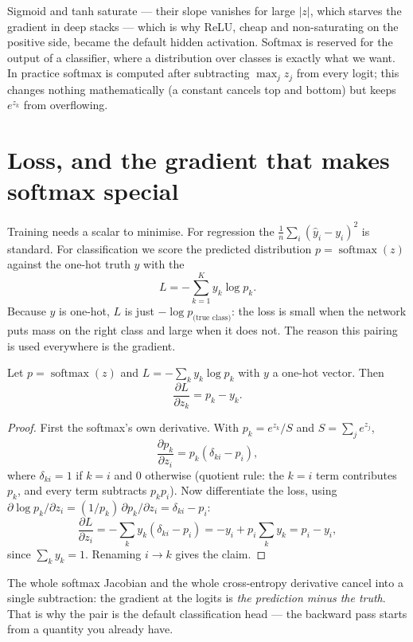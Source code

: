 \documentclass[11pt]{article}
\begin{document}
Sigmoid and tanh saturate --- their slope vanishes for large $|z|$, which
starves the gradient in deep stacks --- which is why ReLU, cheap and
non-saturating on the positive side, became the default hidden activation.
Softmax is reserved for the output of a classifier, where a distribution over
classes is exactly what we want. In practice softmax is computed after
subtracting $\max_j z_j$ from every logit; this changes nothing mathematically
(a constant cancels top and bottom) but keeps $e^{z_k}$ from overflowing.

\section{Loss, and the gradient that makes softmax special}

Training needs a scalar to minimise. For regression the  $\tfrac1n\sum_i (\hat y_i - y_i)^2$ is standard. For classification we
score the predicted distribution $p=\operatorname{softmax}(z)$ against the
one-hot truth $y$ with the 
\[
  L = -\sum_{k=1}^{K} y_k \log p_k .
\]
Because $y$ is one-hot, $L$ is just $-\log p_{\text{(true class)}}$: the loss is
small when the network puts mass on the right class and large when it does not.
The reason this pairing is used everywhere is the gradient.

\begin{theorem}
Let $p=\operatorname{softmax}(z)$ and $L = -\sum_k y_k \log p_k$ with $y$ a
one-hot vector. Then
\[
  \frac{\partial L}{\partial z_k} = p_k - y_k .
\]
\end{theorem}
\begin{proof}
First the softmax's own derivative. With $p_k = e^{z_k}/S$ and
$S=\sum_j e^{z_j}$,
\[
  \frac{\partial p_k}{\partial z_i}
   = p_k(\delta_{ki} - p_i),
\]
where $\delta_{ki}=1$ if $k=i$ and $0$ otherwise (quotient rule: the $k=i$ term
contributes $p_k$, and every term subtracts $p_k p_i$). Now differentiate the
loss, using $\partial \log p_k/\partial z_i = (1/p_k)\,\partial p_k/\partial z_i
= \delta_{ki}-p_i$:
\[
  \frac{\partial L}{\partial z_i}
   = -\sum_k y_k(\delta_{ki}-p_i)
   = -y_i + p_i\sum_k y_k
   = p_i - y_i,
\]
since $\sum_k y_k = 1$. Renaming $i\to k$ gives the claim.
\end{proof}

The whole softmax Jacobian and the whole cross-entropy derivative cancel into a
single subtraction: the gradient at the logits is \emph{the prediction minus the
truth}. That is why the pair is the default classification head --- the backward
pass starts from a quantity you already have.
\end{document}
